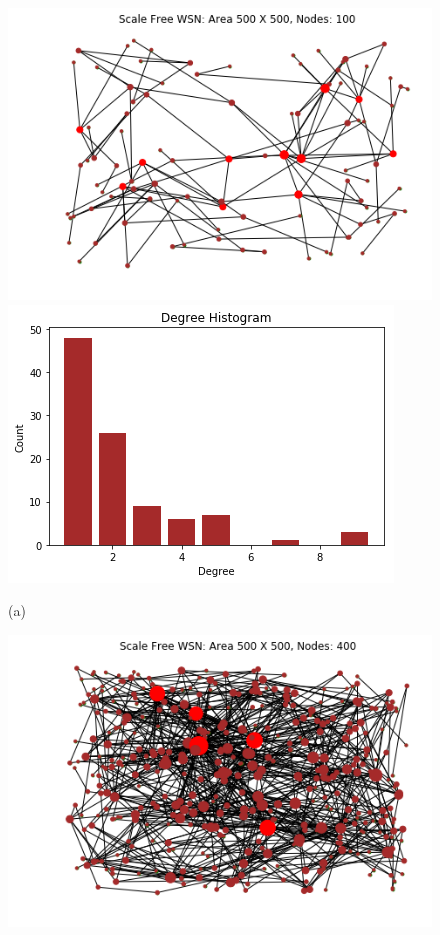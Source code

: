 \documentclass{article}
\begin{document}
	\begin{figure}[!htb]
		\includegraphics[width=\linewidth]{Results/100-1.png}
		\includegraphics[width=\linewidth]{Results/100-1(B).png}
		\begin{center}
			(a)
		\end{center}
		\endminipage\hfill
		\includegraphics[width=\linewidth]{Results/400-1.png}

\end{figure}
\end{document}
